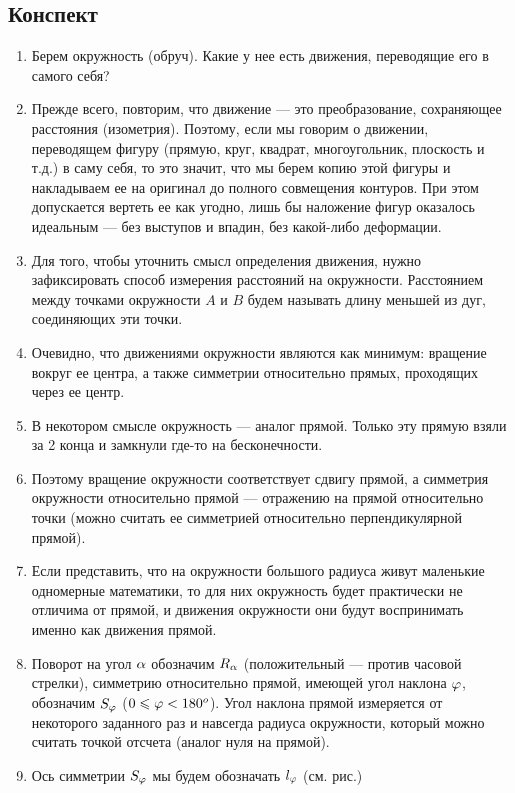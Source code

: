 \subsection{Конспект}
\begin{enumerate}\setlength{\itemsep}{1pt}
\item Берем окружность (обруч). Какие у нее есть движения, переводящие его в самого себя?
\item Прежде всего, повторим, что движение --- это преобразование, сохраняющее расстояния (изометрия). Поэтому, если мы говорим о движении, переводящем фигуру (прямую, круг, квадрат, многоугольник, плоскость и т.д.) в саму себя, то это значит, что мы берем копию этой фигуры и накладываем ее на оригинал до полного совмещения контуров. При этом допускается вертеть ее как угодно, лишь бы наложение фигур оказалось идеальным --- без выступов и впадин, без какой-либо деформации.
\item Для того, чтобы уточнить смысл определения движения, нужно зафиксировать способ измерения расстояний на окружности.  Расстоянием между точками окружности $A$ и $B$  будем называть длину меньшей из дуг, соединяющих эти точки.
\item Очевидно, что движениями окружности являются как минимум: вращение вокруг ее центра, а также симметрии относительно прямых, проходящих через ее центр.
\item В некотором смысле окружность --- аналог прямой. Только эту прямую взяли за 2 конца и замкнули где-то на бесконечности.
\item Поэтому вращение окружности соответствует сдвигу прямой, а симметрия окружности относительно прямой --- отражению на прямой относительно точки (можно считать ее симметрией относительно перпендикулярной прямой).
\item Если представить, что на окружности большого радиуса живут маленькие одномерные математики, то для них окружность будет практически не отличима от прямой, и движения окружности они будут воспринимать именно как движения прямой.
\item Поворот на угол $\alpha$ обозначим $R_\alpha$ (положительный --- против часовой стрелки), симметрию относительно прямой, имеющей угол наклона $\varphi$, обозначим $S_\varphi$ ($0\leqslant\varphi<180^o$). Угол наклона прямой измеряется от некоторого заданного раз и навсегда радиуса окружности, который можно считать точкой отсчета (аналог нуля на прямой).
\item Ось симметрии $S_\varphi$ мы будем обозначать $l_\varphi$ (см. рис.)


\end{enumerate}
